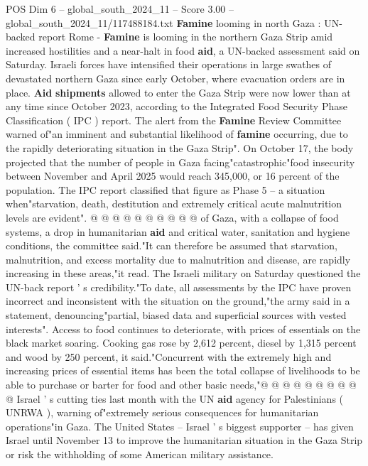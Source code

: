 \begin{textsample}{POS Dim 6 – global\_south\_2024\_11 – Score 3.00 – global\_south\_2024\_11/117488184.txt}  \label{ex:f6_pos_340}
\textbf{Famine} looming in north Gaza : UN-backed report Rome - \textbf{Famine} is looming in the northern Gaza Strip amid increased hostilities and a near-halt in food \textbf{aid}, a UN-backed assessment said on Saturday.
Israeli forces have intensified their operations in large swathes of devastated northern Gaza since early October, where evacuation orders are in place. \textbf{Aid} \textbf{shipments} allowed to enter the Gaza Strip were now lower than at any time since October 2023, according to the Integrated Food Security Phase Classification ( IPC ) report.
The alert from the \textbf{Famine} Review Committee warned of"an imminent and substantial likelihood of \textbf{famine} occurring, due to the rapidly deteriorating situation in the Gaza Strip".
On October 17, the body projected that the number of people in Gaza facing"catastrophic"food insecurity between November and April 2025 would reach 345,000, or 16 percent of the population.
The IPC report classified that figure as Phase 5 -- a situation when"starvation, death, destitution and extremely critical acute malnutrition levels are evident". @ @ @ @ @ @ @ @ @ @ of Gaza, with a collapse of food systems, a drop in humanitarian \textbf{aid} and critical water, sanitation and hygiene conditions, the committee said."It can therefore be assumed that starvation, malnutrition, and excess mortality due to malnutrition and disease, are rapidly increasing in these areas,"it read.
The Israeli military on Saturday questioned the UN-back report ' s credibility."To date, all assessments by the IPC have proven incorrect and inconsistent with the situation on the ground,"the army said in a statement, denouncing"partial, biased data and superficial sources with vested interests".
Access to food continues to deteriorate, with prices of essentials on the black market soaring.
Cooking gas rose by 2,612 percent, diesel by 1,315 percent and wood by 250 percent, it said."Concurrent with the extremely high and increasing prices of essential items has been the total collapse of livelihoods to be able to purchase or barter for food and other basic needs,"@ @ @ @ @ @ @ @ @ @ Israel ' s cutting ties last month with the UN \textbf{aid} agency for Palestinians ( UNRWA ), warning of"extremely serious consequences for humanitarian operations"in Gaza.
The United States -- Israel ' s biggest supporter -- has given Israel until November 13 to improve the humanitarian situation in the Gaza Strip or risk the withholding of some American military assistance.

\end{textsample}
